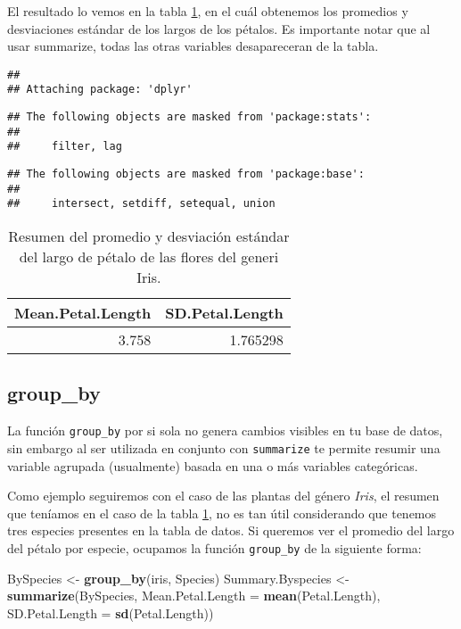 \documentclass[]{book}
\newenvironment{Shaded}{\begin{snugshade}}{\end{snugshade}}
\newcommand{\DataTypeTok}[1]{\textcolor[rgb]{0.13,0.29,0.53}{#1}}
\newcommand{\KeywordTok}[1]{\textcolor[rgb]{0.13,0.29,0.53}{\textbf{#1}}}
\newcommand{\NormalTok}[1]{#1}
\newcommand{\StringTok}[1]{\textcolor[rgb]{0.31,0.60,0.02}{#1}}
\begin{document}
El resultado lo vemos en la tabla \ref{tab:SummaryPetaltab}, en el cuál
obtenemos los promedios y desviaciones estándar de los largos de los
pétalos. Es importante notar que al usar summarize, todas las otras
variables desapareceran de la tabla.

\begin{verbatim}
## 
## Attaching package: 'dplyr'
\end{verbatim}

\begin{verbatim}
## The following objects are masked from 'package:stats':
## 
##     filter, lag
\end{verbatim}

\begin{verbatim}
## The following objects are masked from 'package:base':
## 
##     intersect, setdiff, setequal, union
\end{verbatim}

\begin{table}

\caption{\label{tab:SummaryPetaltab}Resumen del promedio y desviación estándar del largo de pétalo de las flores del generi Iris.}
\centering
\begin{tabular}[t]{rr}
\toprule
Mean.Petal.Length & SD.Petal.Length\\
\midrule
3.758 & 1.765298\\
\bottomrule
\end{tabular}
\end{table}

\hypertarget{group_by}{%
\subsection{group\_by}\label{group_by}}

La función \texttt{group\_by} por si sola no genera cambios visibles en
tu base de datos, sin embargo al ser utilizada en conjunto con
\texttt{summarize} te permite resumir una variable agrupada (usualmente)
basada en una o más variables categóricas.

Como ejemplo seguiremos con el caso de las plantas del género
\emph{Iris}, el resumen que teníamos en el caso de la tabla
\ref{tab:SummaryPetaltab}, no es tan útil considerando que tenemos tres
especies presentes en la tabla de datos. Si queremos ver el promedio del
largo del pétalo por especie, ocupamos la función \texttt{group\_by} de
la siguiente forma:

\begin{Shaded}
\begin{Highlighting}[]
\NormalTok{BySpecies <-}\StringTok{ }\KeywordTok{group_by}\NormalTok{(iris, Species)}
\NormalTok{Summary.Byspecies <-}\StringTok{ }\KeywordTok{summarize}\NormalTok{(BySpecies, }\DataTypeTok{Mean.Petal.Length =} \KeywordTok{mean}\NormalTok{(Petal.Length), }\DataTypeTok{SD.Petal.Length =} \KeywordTok{sd}\NormalTok{(Petal.Length))}
\end{Highlighting}
\end{Shaded}
\end{document}
